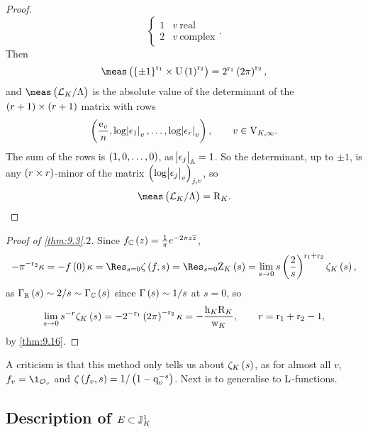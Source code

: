 \begin{proof}
$$\begin{cases}
1 & v \ \text{real} \\
2 & v \ \text{complex}
\end{cases}.
$$
Then
$$ \meas\br{\cbr{\pm 1}^{\r_1} \times \U\br{1}^{\r_2}} = 2^{\r_1}\br{2\pi}^{\r_2}, $$
and $ \meas\br{\LLL_K / \Lambda} $ is the absolute value of the determinant of the $ \br{r + 1} \times \br{r + 1} $ matrix with rows
$$ \br{\dfrac{\e_v}{n}, \log \abs{\epsilon_1}_v, \dots, \log \abs{\epsilon_r}_v}, \qquad v \in \V_{K, \infty}. $$
The sum of the rows is $ \br{1, 0, \dots, 0} $, as $ \abs{\epsilon_j}_{\mathbb{A}} = 1 $. So the determinant, up to $ \pm 1 $, is any $ \br{r \times r} $-minor of the matrix $ \br{\log \abs{\epsilon_j}_v}_{j, v} $, so
$$ \meas\br{\LLL_K / \Lambda} = \R_K. $$
\end{proof}

\pagebreak

\begin{proof}[Proof of \ref{thm:9.3}.$ 2 $]
Since $ f_\CC\br{z} = \tfrac{1}{\pi}e^{-2\pi z\overline{z}} $,
$$ -\pi^{-\r_2}\kappa = -f\br{0}\kappa = \Res_{s = 0} \zeta\br{f, s} = \Res_{s = 0} \Z_K\br{s} = \lim_{s \to 0} s\br{\dfrac{2}{s}}^{\r_1 + \r_2}\zeta_K\br{s}, $$
as $ \Gamma_\RR\br{s} \sim 2 / s \sim \Gamma_\CC\br{s} $ since $ \Gamma\br{s} \sim 1 / s $ at $ s = 0 $, so
$$ \lim_{s \to 0} s^{-r}\zeta_K\br{s} = -2^{-\r_1}\br{2\pi}^{-\r_2}\kappa = -\dfrac{\h_K\R_K}{\w_K}, \qquad r = \r_1 + \r_2 - 1, $$
by \ref{thm:9.16}.
\end{proof}

\begin{remark*}
A criticism is that this method only tells us about $ \zeta_K\br{s} $, as for almost all $ v $, $ f_v = \1_{\OOO_v} $ and $ \zeta\br{f_v, s} = 1 / \br{1 - \q_v^{-s}} $. Next is to generalise to $ \mathrm{L} $-functions.
\end{remark*}

\subsection{Description of \texorpdfstring{$ E \subset \mathbb{J}_K^1 $}{the fundamental domain}}

